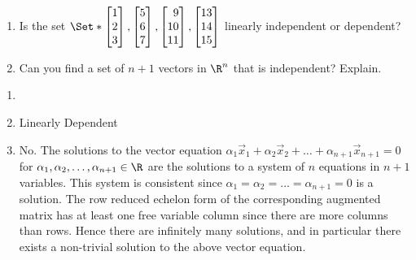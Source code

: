 \begin{exercises}
\begin{problist}
\begin{enumerate}
			\item Is the set $\Set*{\mat{1\\2\\3},\mat{5\\6\\7},
				\mat{9\\10\\11}, \mat{13\\14\\15}}$ linearly
			independent or dependent?
			
			\item Can you find a set of $n+1$ vectors in $\R^{n}$ that is independent? Explain.
		\end{enumerate}
		\begin{solution}
			\begin{enumerate}
				\item
				\item Linearly Dependent
				\item No. The solutions to the vector equation
				$\alpha_{1}\vec x_{1}+\alpha_{2}\vec x_{2}+\ldots+\alpha_{n+1}\vec x_{n+1}=0$
				for $\alpha_{1},\alpha_{2},\ldots,\alpha_{n+1} \in \R$
				are the solutions to a system of $n$ equations
				in $n+1$ variables. This system is consistent
				since
				$\alpha_{1}=\alpha_{2}=\ldots=\alpha_{n+1}=0$
				is a solution. The row reduced echelon form
				of the corresponding augmented matrix has at
				least one free variable column since there are more
				columns than rows. Hence there are
				infinitely many solutions, and in particular
				there exists a non-trivial solution to the
				above vector equation.
			\end{enumerate}
		\end{solution}
		

\end{problist}
\end{exercises}
